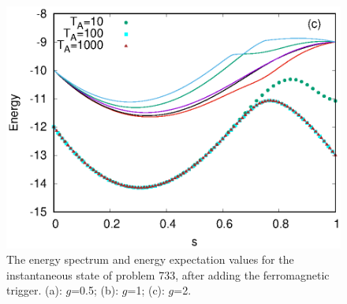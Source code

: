\documentclass[../main.tex]{subfiles}
\begin{document}
\begin{figure}
\includegraphics[scale=0.8]{733_s12_F_g2.eps}

\caption{The energy spectrum and energy expectation values for the instantaneous state of problem 733, after adding the ferromagnetic trigger. (a): $g$=0.5; (b): $g$=1; (c): $g$=2. }
\label{fig:f1}
\end{figure}
\end{document}
